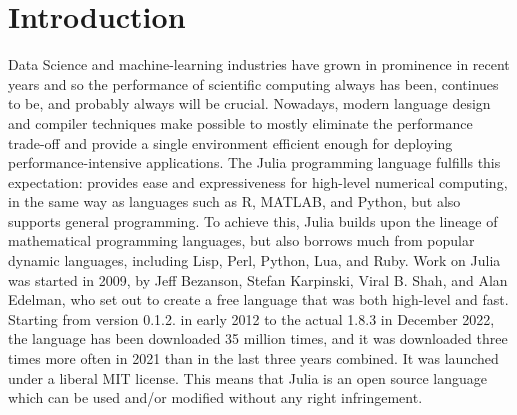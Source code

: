 \documentclass{article}
\begin{document}
\section{Introduction}
Data Science and machine-learning industries have grown in prominence in recent years and so the performance of scientific computing always has been, continues to be, and probably always will be crucial.
Nowadays, modern language design and compiler techniques make possible to mostly eliminate the performance trade-off and provide a single environment efficient enough for deploying performance-intensive applications. The Julia programming language fulfills this expectation: provides ease and expressiveness for high-level numerical computing, in the same way as languages such as R, MATLAB, and Python, but also supports general programming. To achieve this, Julia builds upon the lineage of mathematical programming languages, but also borrows much from popular dynamic languages, including Lisp, Perl, Python, Lua, and Ruby.
Work on Julia was started in 2009, by Jeff Bezanson, Stefan Karpinski, Viral B. Shah, and Alan Edelman, who set out to create a free language that was both high-level and fast. Starting from version 0.1.2. in early 2012 to the actual 1.8.3 in December 2022, the language has been downloaded 35 million times, and it was downloaded three times more often in 2021 than in the last three years combined.
It was launched under a liberal MIT license. This means that Julia is an open source language which can be used and/or modified without any right infringement.
\end{document}
